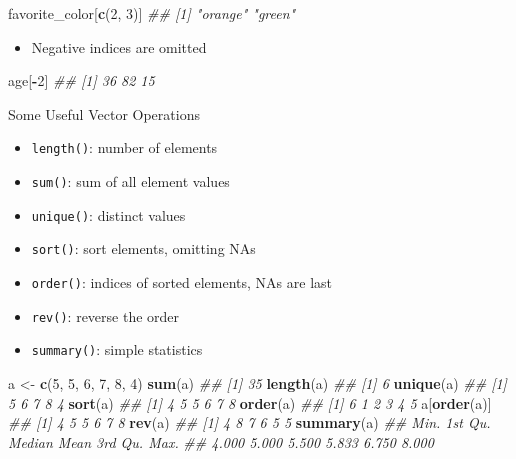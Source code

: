 \documentclass[
]{book}
\newenvironment{Shaded}{\begin{snugshade}}{\end{snugshade}}
\newcommand{\CommentTok}[1]{\textcolor[rgb]{0.56,0.35,0.01}{\textit{#1}}}
\newcommand{\DecValTok}[1]{\textcolor[rgb]{0.00,0.00,0.81}{#1}}
\newcommand{\KeywordTok}[1]{\textcolor[rgb]{0.13,0.29,0.53}{\textbf{#1}}}
\newcommand{\NormalTok}[1]{#1}
\newcommand{\OperatorTok}[1]{\textcolor[rgb]{0.81,0.36,0.00}{\textbf{#1}}}
\newcommand{\StringTok}[1]{\textcolor[rgb]{0.31,0.60,0.02}{#1}}
\providecommand{\tightlist}{%
  \setlength{\itemsep}{0pt}\setlength{\parskip}{0pt}}
\begin{document}
\begin{Shaded}
\begin{Highlighting}[]
\NormalTok{favorite_color[}\KeywordTok{c}\NormalTok{(}\DecValTok{2}\NormalTok{, }\DecValTok{3}\NormalTok{)]}
\CommentTok{## [1] "orange" "green"}
\end{Highlighting}
\end{Shaded}

\begin{itemize}
\tightlist
\item
  Negative indices are omitted
\end{itemize}

\begin{Shaded}
\begin{Highlighting}[]
\NormalTok{age[}\OperatorTok{-}\DecValTok{2}\NormalTok{]}
\CommentTok{## [1] 36 82 15}
\end{Highlighting}
\end{Shaded}

Some Useful Vector Operations

\begin{itemize}
\tightlist
\item
  \texttt{length()}: number of elements
\item
  \texttt{sum()}: sum of all element values
\item
  \texttt{unique()}: distinct values
\item
  \texttt{sort()}: sort elements, omitting NAs
\item
  \texttt{order()}: indices of sorted elements, NAs are last
\item
  \texttt{rev()}: reverse the order
\item
  \texttt{summary()}: simple statistics
\end{itemize}

\begin{Shaded}
\begin{Highlighting}[]
\NormalTok{a <-}\StringTok{ }\KeywordTok{c}\NormalTok{(}\DecValTok{5}\NormalTok{, }\DecValTok{5}\NormalTok{, }\DecValTok{6}\NormalTok{, }\DecValTok{7}\NormalTok{, }\DecValTok{8}\NormalTok{, }\DecValTok{4}\NormalTok{)}
\KeywordTok{sum}\NormalTok{(a)}
\CommentTok{## [1] 35}
\KeywordTok{length}\NormalTok{(a)}
\CommentTok{## [1] 6}
\KeywordTok{unique}\NormalTok{(a)}
\CommentTok{## [1] 5 6 7 8 4}
\KeywordTok{sort}\NormalTok{(a)}
\CommentTok{## [1] 4 5 5 6 7 8}
\KeywordTok{order}\NormalTok{(a)}
\CommentTok{## [1] 6 1 2 3 4 5}
\NormalTok{a[}\KeywordTok{order}\NormalTok{(a)]}
\CommentTok{## [1] 4 5 5 6 7 8}
\KeywordTok{rev}\NormalTok{(a)}
\CommentTok{## [1] 4 8 7 6 5 5}
\KeywordTok{summary}\NormalTok{(a)}
\CommentTok{##    Min. 1st Qu.  Median    Mean 3rd Qu.    Max. }
\CommentTok{##   4.000   5.000   5.500   5.833   6.750   8.000}
\end{Highlighting}
\end{Shaded}
\end{document}
